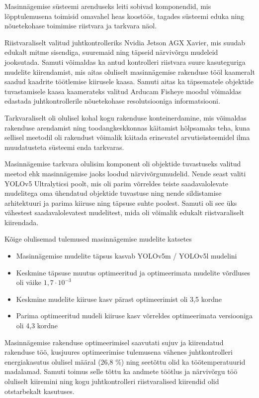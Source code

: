 
Masinnägemise süsteemi arenduseks leiti sobivad komponendid, mis lõpptulemusena toimisid omavahel heas koostöös, tagades süsteemi eduka ning nõuetekohase toimimise riistvara ja tarkvara näol.

Riistvaraliselt valitud juhtkontrolleriks Nvidia Jetson AGX Xavier, mis suudab edukalt mitme sisendiga, suuremaid ning täpseid närvivõrgu mudeleid jooksutada. Samuti võimaldas ka antud kontrolleri riistvara suure kasuteguriga mudelite kiirendamist, mis aitas oluliselt masinnägemise rakenduse tööl kaameralt saadud kaadrite töötlemise kiirusele kaasa. Samuti aitas ka täpsematele objektide tuvastamisele kaasa kaamerateks valitud Arducam Fisheye moodul võimaldas edastada juhtkontrollerile nõuetekohase resolutsiooniga informatsiooni.

Tarkvaraliselt oli olulisel kohal kogu rakenduse konteinerdamine, mis võimaldas rakenduse arendamist ning toodangkeskkonnas käitamist hõlpsamaks teha, kuna sellisel meetodil oli rakendust võimalik käitada erinevatel arvutisüsteemidel ilma muudatusteta süsteemi enda tarkvaras.

Masinnägemise tarkvara olulisim komponent oli objektide tuvastuseks valitud meetod ehk masinnägemise jaoks loodud närvivõrgumudelid. Nende seast valiti YOLOv5 Ultralyticsi poolt, mis oli parim võrreldes teiste saadavalolevate mudelitega oma ühendatud objektide tuvastuse ning nende sildistamise arhitektuuri ja parima kiiruse ning täpsuse suhte poolest. Samuti oli see üks vähestest saadavalolevatest mudelitest, mida oli võimalik edukalt riistvaraliselt kiirendada.

Kõige olulisemad tulemused masinnägemise mudelite katsetes

\begin{itemize}
\item
  Masinnägemise mudelite täpsus kasvab YOLOv5m / YOLOv5l mudelini
\item
  Keskmine täpsuse muutus optimeeritud ja optimeerimata mudelite võrdluses oli väike \({1,7 \cdot 10}^{- 3}\)
\item
  Keskmine mudelite kiiruse kasv pärast optimeerimist oli 3,5 kordne
\item
  Parima optimeeritud mudeli kiiruse kasv võrreldes optimeerimata versiooniga oli 4,3 kordne
\end{itemize}

Masinnägemise rakenduse optimeerimisel saavutati sujuv ja kiirendatud rakenduse töö, kusjuures optimeerimise tulemusena vähenes juhtkontrolleri energiakasutus olulisel määral (26,8 \%) ning seetõttu olid ka töötemperatuurid madalamad. Samuti toimus selle tõttu ka andmete töötlus ja närvivõrgu töö oluliselt kiiremini ning kogu juhtkontrolleri riistvaralised kiirendid olid otstarbekalt kasutuses.
